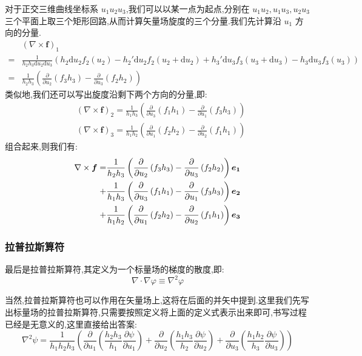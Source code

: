 \documentclass[UTF8]{ctexbook}
\newcommand{\D}{\text{d}}
\newcommand{\pd}[2]{\frac{\partial #1}{\partial #2}}
\newcommand{\downpd}[2]{\frac{\partial}{\partial #2}\left(#1\right)}
\begin{document}
对于正交三维曲线坐标系 $u_1u_2u_3$,我们可以以某一点为起点,分别在 $u_1u_2,u_1u_3,u_2u_3$ 三个平面上取三个矩形回路,从而计算矢量场旋度的三个分量.我们先计算沿 $u_1$ 方向的分量.
\begin{align*}
    &\left(\nabla \times \boldsymbol{f}\right)_1 \\
    = &\frac{1}{h_2h_3\D u_2\D u_3} \left(h_2\D u_2 f_2(u_2) - h_2'\D u_2 f_2(u_2 +\D u_2) + h_3'\D u_3 f_3(u_3 +\D u_3) - h_3\D u_3 f_3(u_3)\right) \\
    = & \frac{1}{h_2h_3}\left(\downpd{f_3h_3}{u_2} - \downpd{f_2 h_2}{u_3}\right)
\end{align*}
类似地,我们还可以写出旋度沿剩下两个方向的分量,即:
\begin{align*}
    & (\nabla \times \boldsymbol{f})_2 = \frac{1}{h_1h_3} \left( \downpd{f_1h_1}{u_3} - \downpd{f_3h_3}{u_1}\right) \\
    & (\nabla \times \boldsymbol{f})_3 = \frac{1}{h_1h_2} \left( \downpd{f_2h_2}{u_1} - \downpd{f_1h_1}{u_2}\right)
\end{align*}
组合起来,则我们有:
\begin{align}
    \nabla \times \boldsymbol{f} = &\frac{1}{h_2h_3}\left(\downpd{f_3h_3}{u_2} - \downpd{f_2 h_2}{u_3}\right) \boldsymbol{e_1} \notag \\ 
    + &\frac{1}{h_1h_3} \left( \downpd{f_1h_1}{u_3} - \downpd{f_3h_3}{u_1}\right)\boldsymbol{e_2} \notag \\
    + &\frac{1}{h_1h_2} \left( \downpd{f_2h_2}{u_1} - \downpd{f_1h_1}{u_2}\right)\boldsymbol{e_3}
\end{align}

\subsubsection{拉普拉斯算符}

\begin{definition}
    最后是拉普拉斯算符,其定义为一个标量场的梯度的散度,即:
    \[\nabla \cdot \nabla \varphi \equiv \nabla^2 \varphi\]
\end{definition}

当然,拉普拉斯算符也可以作用在矢量场上,这将在后面的并矢中提到.这里我们先写出标量场的拉普拉斯算符,只需要按照定义将上面的定义式表示出来即可,书写过程已经是无意义的,这里直接给出答案:
\begin{equation}
    \nabla^2 \psi = \frac{1}{h_1h_2h_3} \left(\downpd{\frac{h_2h_3}{h_1} \pd{\psi}{u_1}}{u_1} + \downpd{\frac{h_1h_3}{h_2} \pd{\psi}{u_2}}{u_2} + \downpd{\frac{h_1h_2}{h_3} \pd{\psi}{u_3}}{u_3}\right)
\end{equation}
\end{document}
